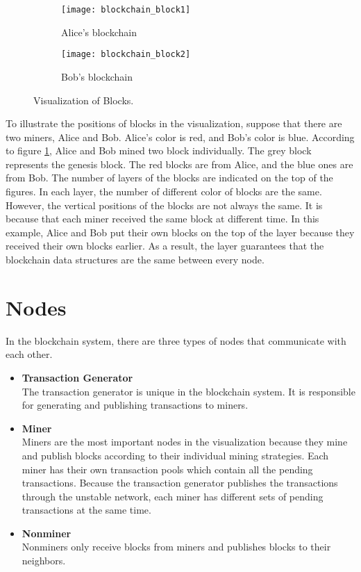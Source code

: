 \begin{figure}[htb]
    \centering
    \begin{subfigure}[b]{0.4\textwidth}
        \centering
        \texttt{[image: blockchain\_block1]}
        \caption{Alice's blockchain}
    \end{subfigure}
    \hfill
    \begin{subfigure}[b]{0.4\textwidth}
        \centering
        \texttt{[image: blockchain\_block2]}
        \caption{Bob's blockchain}
    \end{subfigure}

    \caption{Visualization of Blocks.}
    \label{fig:visualization of blocks}
\end{figure}

To illustrate the positions of blocks in the visualization, suppose that there are two miners, Alice and Bob. Alice's color is red, and Bob's color is blue. According to figure \ref{fig:visualization of blocks}, Alice and Bob mined two block individually. The grey block represents the genesis block. The red blocks are from Alice, and the blue ones are from Bob. The number of layers of the blocks are indicated on the top of the figures. In each layer, the number of different color of blocks are the same. However, the vertical positions of the blocks are not always the same. It is because that each miner received the same block at different time. In this example, Alice and Bob put their own blocks on the top of the layer because they received their own blocks earlier. As a result, the layer guarantees that the blockchain data structures are the same between every node.

\section{Nodes}

In the blockchain system, there are three types of nodes that communicate with each other. 
\begin{itemize}
    \item \textbf{Transaction Generator} \\
        The transaction generator is unique in the blockchain system. It is responsible for generating and publishing transactions to miners.
    \item \textbf{Miner} \\
        Miners are the most important nodes in the visualization because they mine and publish blocks according to their individual mining strategies. Each miner has their own transaction pools which contain all the pending transactions. Because the transaction generator publishes the transactions through the unstable network, each miner has different sets of pending transactions at the same time.
    \item \textbf{Nonminer} \\
        Nonminers only receive blocks from miners and publishes blocks to their neighbors.
\end{itemize}


